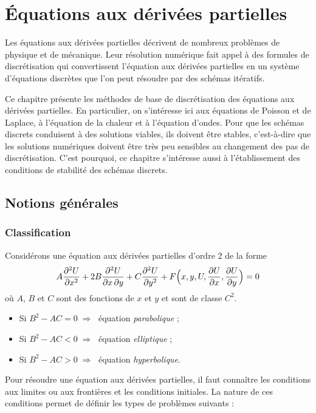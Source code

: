 \chapter{Équations aux dérivées partielles}

Les équations aux dérivées partielles décrivent de nombreux problèmes de
physique et de mécanique. Leur résolution numérique fait appel à des formules
de discrétisation qui convertissent l'équation aux dérivées partielles en un
système d'équations discrètes que l'on peut résoudre par des schémas
itératifs.

Ce chapitre présente les méthodes de base de discrétisation des équations aux
dérivées partielles. En particulier, on s'intéresse ici aux équations de
Poisson et de Laplace, à l'équation de la chaleur et à l'équation d'ondes.
Pour que les schémas discrets conduisent à des solutions viables, ils doivent
être stables, c'est-à-dire que les solutions numériques doivent être très peu
sensibles au changement des pas de discrétisation. C'est pourquoi, ce chapitre
s'intéresse aussi à l'établissement des conditions de stabilité des schémas
discrets.

\section{Notions générales}

\subsection{Classification}

Considérons une équation aux dérivées partielles d'ordre 2 de la forme
\[
  A\frac{\partial^2 U}{\partial x^2} + 2B\frac{\partial^2 U}{\partial x\,\partial y}
  + C\frac{\partial^2 U}{\partial y^2}
  + F\Bigl(x, y, U, \frac{\partial U}{\partial x}, \frac{\partial U}{\partial y}\Bigr) = 0
\]
où $A$, $B$ et $C$ sont des fonctions de $x$ et $y$ et sont de classe $C^2$.
\begin{itemize}[label=$\blacklozenge$]
  \item Si $B^2 - AC = 0 \;\Longrightarrow\;$ équation \emph{parabolique} ;
  \item Si $B^2 - AC < 0 \;\Longrightarrow\;$ équation \emph{elliptique} ;
  \item Si $B^2 - AC > 0 \;\Longrightarrow\;$ équation \emph{hyperbolique}.
\end{itemize}

Pour résoudre une équation aux dérivées partielles, il faut connaître les
conditions aux limites ou aux frontières et les conditions initiales. La
nature de ces conditions permet de définir les types de problèmes suivants :

